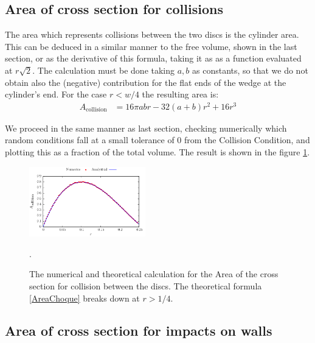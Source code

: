 \documentclass[superscriptaddress,pre,reprint,showpacs,onecolumn]{revtex4-1}
\begin{document}
\subsection{Area of cross section for collisions}

The area which represents collisions between the two discs is the cylinder area. 
This can be deduced in a similar manner to the free volume, shown in the last
section, or as the derivative of this formula, taking it as as a function evaluated at 
$r\sqrt{2}$. The calculation must be done taking $a,b$ as constants, so that
we do not obtain also the (negative) contribution for the flat ends of
the wedge at the cylinder's end. For the case $r<w/4$ the resulting area is:
\begin{align}\label{AreaChoque}
A_\text{collision} & =  
16\pi a b r -32 (a+b)r^2 +16 r^3 
\end{align}

We proceed in the same manner as last section, checking numerically which
random
conditions fall at a small tolerance of $0$ from the Collision Condition, and
plotting this as a fraction of the total volume. The result is shown in the
figure \ref{AreaChoqueTeoyNum}. 
\begin{figure}
\centering
\includegraphics[width=0.45\textwidth]{./FigurasPerfectas/AreaCol02.pdf}
\caption{The numerical and theoretical calculation for the Area of the cross section
for collision between the discs.  The theoretical formula 
\ref{AreaChoque} breaks down at
$r>1/4$.}
\label{AreaChoqueTeoyNum}.
\end{figure}


\subsection{Area of cross section for  impacts on walls}
\end{document}
